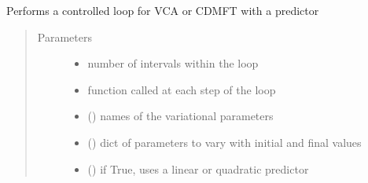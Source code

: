 \documentclass[letterpaper,10pt,english]{sphinxmanual}
\begin{document}
\begin{fulllineitems}
\label{\detokenize{utilities:pyqcm.loop.linear_loop}}
\sphinxAtStartPar
Performs a controlled loop for VCA or CDMFT with a predictor
\begin{quote}\begin{description}
\item[{Parameters}] \leavevmode\begin{itemize}
\item {} 
\sphinxAtStartPar
{} \textendash{} number of intervals within the loop

\item {} 
\sphinxAtStartPar
{} \textendash{} function called at each step of the loop

\item {} 
\sphinxAtStartPar
{} (\sphinxstyleliteralemphasis{\sphinxupquote{{[}}}\sphinxstyleliteralemphasis{\sphinxupquote{{]}}}) \textendash{} names of the variational parameters

\item {} 
\sphinxAtStartPar
{} (\sphinxstyleliteralemphasis{\sphinxupquote{(}}\sphinxstyleliteralemphasis{\sphinxupquote{,}}\sphinxstyleliteralemphasis{\sphinxupquote{)}}\sphinxstyleliteralemphasis{\sphinxupquote{\}}}) \textendash{} dict of parameters to vary with initial and final values

\item {} 
\sphinxAtStartPar
{} () \textendash{} if True, uses a linear or quadratic predictor

\end{itemize}

\end{description}\end{quote}

\end{fulllineitems}
\end{document}
